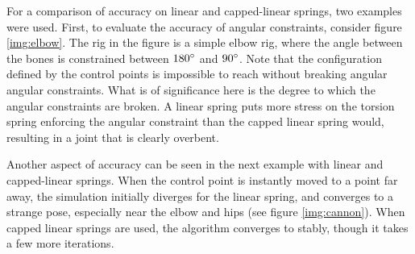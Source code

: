 \documentclass[10pt,twocolumn,letterpaper]{article}
\begin{document}
For a comparison of accuracy on linear and capped-linear springs, two examples were used. First, to evaluate the accuracy of angular constraints, consider figure \ref{img:elbow}. The rig in the figure is a simple elbow rig, where the angle between the bones is constrained between $180\degree$ and $90\degree$. Note that the configuration defined by the control points is impossible to reach without breaking angular angular constraints. What is of significance here is the degree to which the angular constraints are broken. A linear spring puts more stress on the torsion spring enforcing the angular constraint than the capped linear spring would, resulting in a joint that is clearly overbent.

Another aspect of accuracy can be seen in the next example with linear and capped-linear springs. When the control point is instantly moved to a point far away, the simulation initially diverges for the linear spring, and converges to a strange pose, especially near the elbow and hips (see figure \ref{img:cannon}). When capped linear springs are used, the algorithm converges to stably, though it takes a few more iterations.
\end{document}
